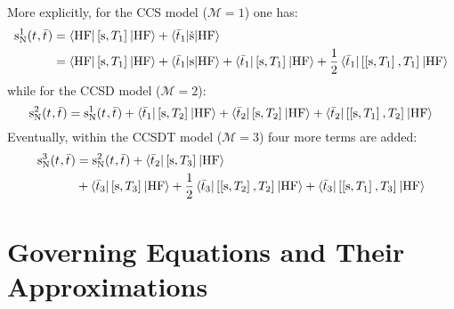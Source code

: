 More explicitly, for the \ac{CCS} model ($\mathcal{M} = 1$) one has:
\begin{equation}
  \begin{aligned}
  \mathrm{s}_{\mathrm{N}}^1(t_{}, \bar{t}_{}) &=
  \braket{\mathrm{HF} | \left[ \mathrm{s}, T_1 \right]^{} | \mathrm{HF}}
  + \braket{\bar{t}_{1} | \check{\mathrm{s}} | \mathrm{HF}} \\
  &=
  \braket{\mathrm{HF} | \left[ \mathrm{s}, T_1 \right]^{} | \mathrm{HF}}
  + \braket{\bar{t}_{1} | \mathrm{s} | \mathrm{HF}}
  + \braket{\bar{t}_{1} | \left[ \mathrm{s}, T_1 \right]^{} | \mathrm{HF}}
  + \frac{1}{2}\braket{\bar{t}_{1} | \left[ \left[ \mathrm{s}, T_1 \right]^{}, T_1 \right]^{} | \mathrm{HF}}
  \end{aligned}
\end{equation}
while for the \ac{CCSD} model ($\mathcal{M} = 2$):
\begin{equation}
  \mathrm{s}_{\mathrm{N}}^2(t_{}, \bar{t}_{}) =
  \mathrm{s}_{\mathrm{N}}^1(t_{}, \bar{t}_{})
  + \braket{\bar{t}_{1} | \left[ \mathrm{s}, T_2 \right]^{} | \mathrm{HF}}
  + \braket{\bar{t}_{2} | \left[ \mathrm{s}, T_2 \right]^{} | \mathrm{HF}}
  + \braket{\bar{t}_{2} | \left[ \left[ \mathrm{s}, T_1 \right]^{}, T_2 \right]^{} | \mathrm{HF}}
\end{equation}
Eventually, within the \ac{CCSDT} model ($\mathcal{M} = 3$) four more
terms are added:
\begin{equation}
  \begin{aligned}
  \mathrm{s}_{\mathrm{N}}^3(t_{}, \bar{t}_{}) &=
  \mathrm{s}_{\mathrm{N}}^2(t_{}, \bar{t}_{})
  + \braket{\bar{t}_{2} | \left[ \mathrm{s}, T_3 \right]^{} | \mathrm{HF}} \\
  &+ \braket{\bar{t}_{3} | \left[ \mathrm{s}, T_3 \right]^{} | \mathrm{HF}}
  + \frac{1}{2}
  \braket{\bar{t}_{3} | \left[ \left[ \mathrm{s}, T_2 \right]^{}, T_2 \right]^{} |
  \mathrm{HF}}
  + \braket{\bar{t}_{3} | \left[ \left[ \mathrm{s}, T_1 \right]^{}, T_3 \right]^{} |
  \mathrm{HF}}
  \end{aligned}
\end{equation}

\section{Governing Equations and Their Approximations}\label{sec:pcm-cc-models}

